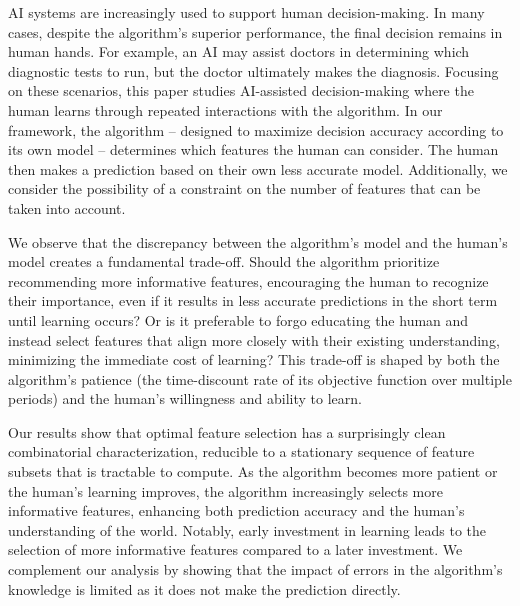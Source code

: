AI systems are increasingly used to support human decision-making. In many cases, despite the algorithm's superior performance, the final decision remains in human hands. For example, an AI may assist doctors in determining which diagnostic tests to run, but the doctor ultimately makes the diagnosis. Focusing on these scenarios, this paper studies AI-assisted decision-making where the human learns through repeated interactions with the algorithm. In our framework, the algorithm -- designed to maximize decision accuracy according to its own model -- determines which features the human can consider. The human then makes a prediction based on their own less accurate model. Additionally, we consider the possibility of a constraint on the number of features that can be taken into account.


We observe that the discrepancy between the algorithm's model and the human's model creates a fundamental trade-off. Should the algorithm prioritize recommending more informative features, encouraging the human to recognize their importance, even if it results in less accurate predictions in the short term until learning occurs? Or is it preferable to forgo educating the human and instead select features that align more closely with their existing understanding, minimizing the immediate cost of learning? 
This trade-off is shaped by both the algorithm's patience (the time-discount rate of its objective function over multiple periods) and the human's willingness and ability to learn.


Our results show that optimal feature selection has a surprisingly clean combinatorial characterization, reducible to a stationary sequence of feature subsets that is tractable to compute.
As the algorithm becomes more patient or the human's learning improves, the algorithm increasingly selects more informative features, enhancing both prediction accuracy and the human's understanding of the world. Notably, early investment in learning leads to the selection of more informative features compared to a later investment. We complement our analysis by showing that the impact of errors in the algorithm's knowledge is limited as it does not make the prediction directly. 

